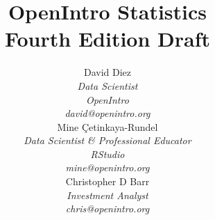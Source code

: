 
\title{\huge OpenIntro Statistics\vspace{1.5mm} \\
    \Large Fourth Edition Draft}
\author{David Diez \\
\small\emph{Data Scientist} \\
\small\emph{OpenIntro} \\
\vspace{6mm}%
\small\emph{david@openintro.org} \\
Mine \c{C}etinkaya-Rundel \\
\small\emph{Data Scientist \& Professional Educator} \\
\small\emph{RStudio} \\
\vspace{6mm}%
\small\emph{mine@openintro.org} \\
Christopher D Barr \\
\small\emph{Investment Analyst} \\
\small\emph{chris@openintro.org}}
